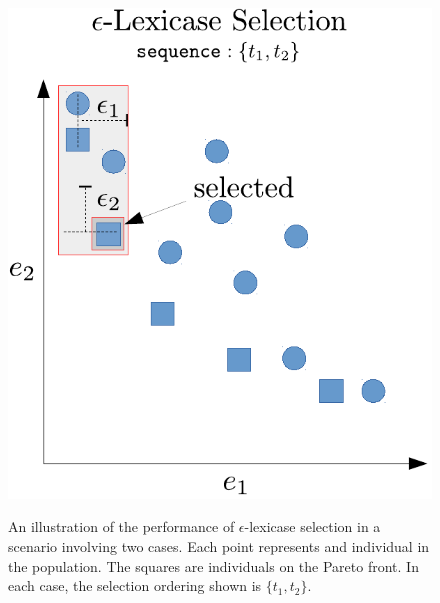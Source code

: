 \documentclass[preprint]{article}
\begin{document}
\begin{figure}
\begin{minipage}{0.49\textwidth}
  \includegraphics[width = \textwidth]{figs/ep-lex_pareto.pdf}\label{fig:ep-lex_pareto}
  \caption{An illustration of the performance of $\epsilon$-lexicase selection in a scenario involving two cases. Each point represents and individual in the population. The squares are individuals on the Pareto front. In each case, the selection ordering shown is $\{t_1,t_2\}$. }
\end{minipage}
\end{figure}
\end{document}
